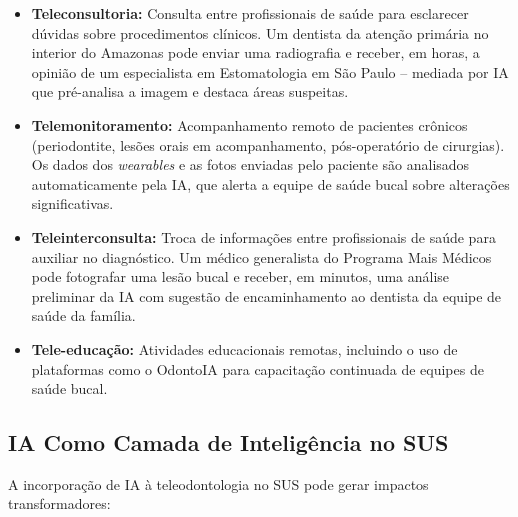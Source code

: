 \begin{itemize}
  \item \textbf{Teleconsultoria:} Consulta entre profissionais de saúde para
    esclarecer dúvidas sobre procedimentos clínicos. Um dentista da atenção
    primária no interior do Amazonas pode enviar uma radiografia e receber, em
    horas, a opinião de um especialista em Estomatologia em São Paulo --
    mediada por IA que pré-analisa a imagem e destaca áreas suspeitas.

  \item \textbf{Telemonitoramento:} Acompanhamento remoto de pacientes crônicos
    (periodontite, lesões orais em acompanhamento, pós-operatório de cirurgias).
    Os dados dos \textit{wearables} e as fotos enviadas pelo paciente são
    analisados automaticamente pela IA, que alerta a equipe de saúde bucal
    sobre alterações significativas.

  \item \textbf{Teleinterconsulta:} Troca de informações entre profissionais
    de saúde para auxiliar no diagnóstico. Um médico generalista do Programa
    Mais Médicos pode fotografar uma lesão bucal e receber, em minutos, uma
    análise preliminar da IA com sugestão de encaminhamento ao dentista da
    equipe de saúde da família.

  \item \textbf{Tele-educação:} Atividades educacionais remotas, incluindo o
    uso de plataformas como o OdontoIA para capacitação continuada de equipes
    de saúde bucal.
\end{itemize}


\subsection{IA Como Camada de Inteligência no SUS}

A incorporação de IA à teleodontologia no SUS pode gerar impactos
transformadores:

